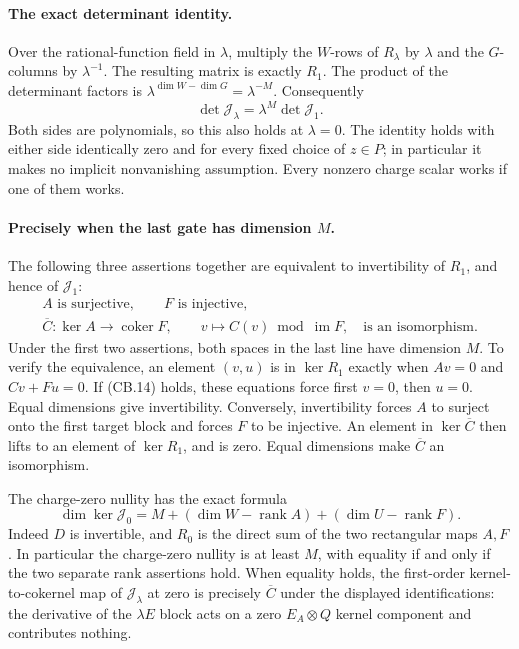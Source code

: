 \paragraph{The exact determinant identity.}
Over the rational-function field in \(\lambda\), multiply
the \(W\)-rows of \(R_\lambda\) by \(\lambda\) and the
\(G\)-columns by \(\lambda^{-1}\). The resulting matrix is
exactly \(R_1\). The product of the determinant factors is
\(\lambda^{\dim W-\dim G}=\lambda^{-M}\). Consequently
\[
 \boxed{\det\mathcal J_\lambda
                 =\lambda^M\det\mathcal J_1.}
                                                               \tag{CB.13}
\]
Both sides are polynomials, so this also holds at \(\lambda=0\).
The identity holds with either side identically zero and for
every fixed choice of \(z\in P\); in particular it makes no
implicit nonvanishing assumption. Every nonzero charge scalar
works if one of them works.

\paragraph{Precisely when the last gate has dimension \(M\).}
The following three assertions together are equivalent to
invertibility of \(R_1\), and hence of \(\mathcal J_1\):
\[
 \begin{gathered}
 A\text{ is surjective},\qquad F\text{ is injective},\\
 \overline C:\ker A\longrightarrow\operatorname{coker}F,
                \qquad v\longmapsto C(v)\bmod\operatorname{im}F,
       \quad\text{is an isomorphism}.
 \end{gathered}                                                \tag{CB.14}
\]
Under the first two assertions, both spaces in the last line
have dimension \(M\). To verify the equivalence, an element
\((v,u)\) is in \(\ker R_1\) exactly when
\(Av=0\) and \(Cv+Fu=0\). If (CB.14) holds, these equations
force first \(v=0\), then \(u=0\). Equal dimensions give
invertibility. Conversely, invertibility forces \(A\) to
surject onto the first target block and forces \(F\) to be
injective. An element in \(\ker\overline C\) then lifts to
an element of \(\ker R_1\), and is zero. Equal dimensions
make \(\overline C\) an isomorphism.

The charge-zero nullity has the exact formula
\[
 \dim\ker\mathcal J_0
   =M+(\dim W-\operatorname{rank}A)
                         +(\dim U-\operatorname{rank}F).
                                                               \tag{CB.15}
\]
Indeed \(D\) is invertible, and \(R_0\) is the direct sum
of the two rectangular maps \(A,F\). In particular the
charge-zero nullity is at least \(M\), with equality if
and only if the two separate rank assertions hold.
When equality holds, the first-order kernel-to-cokernel
map of \(\mathcal J_\lambda\) at zero is precisely
\(\overline C\) under the displayed identifications:
the derivative of the \(\lambda E\) block acts on a zero
\(E_A\otimes Q\) kernel component and contributes nothing.

